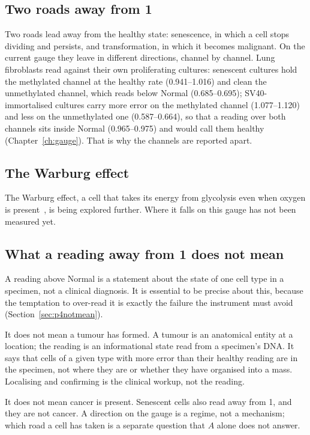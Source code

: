 \subsection{Two roads away from 1}

Two roads lead away from the healthy state: senescence, in which a cell stops dividing and persists, and transformation, in which it
becomes malignant. On the current gauge they leave in different directions, channel by channel. Lung fibroblasts read against their own
proliferating cultures: senescent cultures hold the methylated channel at the healthy rate (0.941--1.016) and clean the unmethylated
channel, which reads below Normal (0.685--0.695); SV40-immortalised cultures carry more error on the methylated channel (1.077--1.120) and
less on the unmethylated one (0.587--0.664), so that a reading over both channels sits inside Normal (0.965--0.975) and would call them
healthy (Chapter~\ref{ch:gauge}). \measured{} That is why the channels are reported apart.

\subsection{The Warburg effect}

The Warburg effect, a cell that takes its energy from glycolysis even when oxygen is present~\cite{Warburg1956}, is being explored further.
Where it falls on this gauge has not been measured yet. \openprob

\subsection{What a reading away from 1 does not mean}

A reading above Normal is a statement about the state of one cell type in a specimen, not a clinical diagnosis. It is essential to be
precise about this, because the temptation to over-read it is exactly the failure the instrument must avoid
(Section~\ref{sec:p4notmean}).

It does not mean a tumour has formed. A tumour is an anatomical entity at a location; the reading is an informational state read from a
specimen's DNA. It says that cells of a given type with more error than their healthy reading are in the specimen, not where they are or
whether they have organised into a mass. Localising and confirming is the clinical workup, not the reading.

It does not mean cancer is present. Senescent cells also read away from 1, and they are not cancer. A direction on the gauge is a regime,
not a mechanism; which road a cell has taken is a separate question that $A$ alone does not answer.

